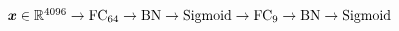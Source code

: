 $\vect{x} \in \real^{4096}
	\newline \rightarrow \text{FC}_{64} \rightarrow \text{BN} \rightarrow \text{Sigmoid}
	\newline \rightarrow \text{FC}_{9} \rightarrow \text{BN} \rightarrow \text{Sigmoid}$